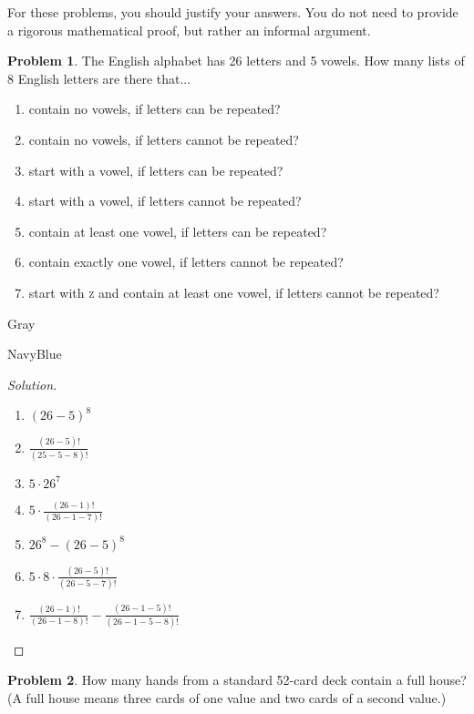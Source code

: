 \documentclass[12pt]{amsart}
\newcounter{problem_number}[section]
\theoremstyle{named}
\newenvironment{soln}
{\begin{color}{Gray}\begin{framed}\begin{color}{NavyBlue}\begin{proof}[Solution]
\doublespacing}
{\end{proof}\end{color}\end{framed}\end{color}}
\theoremstyle{definition}
\newtheorem{problem}{Problem}
\begin{document}
For these problems, you should justify your answers. You do not need to provide a rigorous mathematical proof, but rather an informal argument.

\vspace{5mm}


\begin{problem}
	The English alphabet has 26 letters and 5 vowels. How many lists of 8 English letters are there that...
	\begin{enumerate}
		\item contain no vowels, if letters can be repeated?
		\item contain no vowels, if letters cannot be repeated?
		\item start with a vowel, if letters can be repeated?
		\item start with a vowel, if letters cannot be repeated?
		\item contain at least one vowel, if letters can be repeated?
		\item contain exactly one vowel, if letters cannot be repeated?
		\item start with \textsc{z} and contain at least one vowel, if letters cannot be repeated?
	\end{enumerate}
\end{problem}

\begin{soln}
	\phantom{ }
    \begin{enumerate}
        \item $(26-5)^8$
        \item $\frac{(26-5)!}{(25-5-8)!}$
        \item $5 \cdot 26^7$
        \item $5 \cdot \frac{(26-1)!}{(26-1-7)!}$
        \item $26^8 - (26-5)^8$
        \item $5 \cdot 8 \cdot \frac{(26-5)!}{(26-5-7)!}$
        \item $\frac{(26-1)!}{(26-1-8)!} - \frac{(26-1-5)!}{(26-1-5-8)!}$
    \end{enumerate}
\end{soln}

\begin{problem}
	How many hands from a standard 52-card deck contain a full house? (A full house means three cards of one value and two cards of a second value.)
\end{problem}
\end{document}
